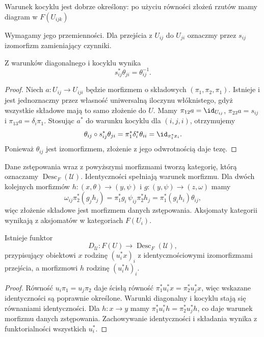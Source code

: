 Warunek kocyklu jest dobrze określony: po użyciu równości złożeń rzutów mamy diagram w $F(U_{ijk})$
\begin{center}
\end{center}
Wymagamy jego przemienności. Dla przejścia z $U_{ij}$ do $U_{ji}$ oznaczmy przez $s_{ij}$ izomorfizm zamieniający czynniki.

\begin{stwierdzenie}\label{cat:prop:descent-inverse}
Z warunków diagonalnego i kocyklu wynika
\[
 s_{ij}^*\theta_{ji}=\theta_{ij}^{-1}.
\]
\end{stwierdzenie}
\begin{proof}
Niech $a:U_{ij}\to U_{iji}$ będzie morfizmem o składowych $(\pi_1,\pi_2,\pi_1)$. Istnieje i jest jednoznaczny przez własność uniwersalną iloczynu włóknistego, gdyż wszystkie składowe mają to samo złożenie do $U$. Mamy $\pi_{12}a=\id_{U_{ij}}$, $\pi_{23}a=s_{ij}$ i $\pi_{13}a=\delta_i\pi_1$. Stosując $a^*$ do warunku kocyklu dla $(i,j,i)$, otrzymujemy
\[
 \theta_{ij}\circ s_{ij}^*\theta_{ji}
 =\pi_1^*\delta_i^*\theta_{ii}
 =\id_{\pi_1^*x_i}.
\]
Ponieważ $\theta_{ij}$ jest izomorfizmem, złożenie z jego odwrotnością daje tezę.
\end{proof}

Dane zstępowania wraz z powyższymi morfizmami tworzą kategorię, którą oznaczamy $\operatorname{Desc}_F(\mathcal U)$. Identyczności spełniają warunek morfizmu. Dla dwóch kolejnych morfizmów $h:(x,\theta)\to(y,\psi)$ i $g:(y,\psi)\to(z,\omega)$ mamy
\[
 \omega_{ij}\pi_2^*(g_jh_j)
 =\pi_1^*g_i\,\psi_{ij}\pi_2^*h_j
 =\pi_1^*(g_ih_i)\theta_{ij},
\]
więc złożenie składowe jest morfizmem danych zstępowania. Aksjomaty kategorii wynikają z aksjomatów w kategoriach $F(U_i)$.

\begin{stwierdzenie}\label{cat:prop:descent-comparison}
Istnieje funktor
\[
 D_{\mathcal U}:F(U)\longrightarrow\operatorname{Desc}_F(\mathcal U),
\]
przypisujący obiektowi $x$ rodzinę $(u_i^*x)_i$ z identycznościowymi izomorfizmami przejścia, a morfizmowi $h$ rodzinę $(u_i^*h)_i$.
\end{stwierdzenie}
\begin{proof}
Równość $u_i\pi_1=u_j\pi_2$ daje ścisłą równość $\pi_1^*u_i^*x=\pi_2^*u_j^*x$, więc wskazane identyczności są poprawnie określone. Warunki diagonalny i kocyklu stają się równaniami identyczności. Dla $h:x\to y$ mamy $\pi_1^*u_i^*h=\pi_2^*u_j^*h$, co daje warunek morfizmu danych zstępowania. Zachowywanie identyczności i składania wynika z funktorialności wszystkich $u_i^*$.
\end{proof}

